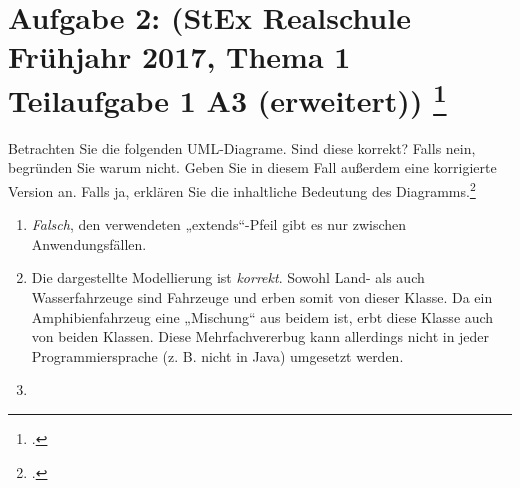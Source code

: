 \documentclass{lehramt-informatik-minimal}
\begin{document}
\section{Aufgabe 2: (StEx Realschule Frühjahr 2017, Thema 1 Teilaufgabe 1 A3
(erweitert)) \footcite{sosy:ab:3}}

Betrachten Sie die folgenden UML-Diagrame. Sind diese korrekt? Falls
nein, begründen Sie warum nicht. Geben Sie in diesem Fall außerdem eine
korrigierte Version an. Falls ja, erklären Sie die inhaltliche Bedeutung
des Diagramms.\footcite{examen:46116:2017:03}

\begin{enumerate}
\item \strut


\begin{antwort}
\emph{Falsch}, den verwendeten „extends“-Pfeil gibt es nur zwischen
Anwendungsfällen.

\end{antwort}

\item \strut


\begin{antwort}
Die dargestellte Modellierung ist \emph{korrekt}. Sowohl Land- als auch
Wasserfahrzeuge sind Fahrzeuge und erben somit von dieser Klasse. Da
ein Amphibienfahrzeug eine „Mischung“ aus beidem ist, erbt diese Klasse
auch von beiden Klassen. Diese Mehrfachvererbug kann allerdings nicht
in jeder Programmiersprache (z. B. nicht in Java) umgesetzt
werden.
\end{antwort}

\item \strut


\end{enumerate}
\end{document}
